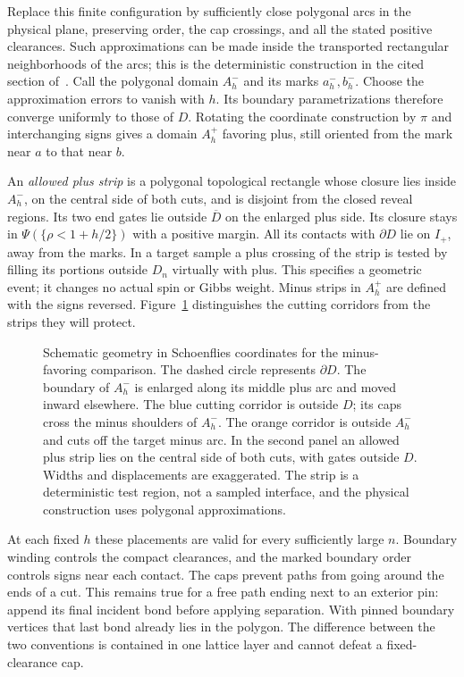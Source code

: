 Replace this finite configuration by sufficiently close polygonal
arcs in the physical plane, preserving order, the cap crossings, and
all the stated positive clearances.  Such approximations can be made
inside the transported rectangular neighborhoods of the arcs; this is
the deterministic construction in the cited section of~\cite{S}.
Call the polygonal domain $A_h^-$ and its marks $a_h^-,b_h^-$.
Choose the approximation errors to vanish with $h$.  Its boundary
parametrizations therefore converge uniformly to those of $D$.
Rotating the coordinate construction by $\pi$ and interchanging signs
gives a domain $A_h^+$ favoring plus, still oriented from the mark
near $a$ to that near $b$.

An \emph{allowed plus strip} is a polygonal topological rectangle
whose closure lies inside $A_h^-$, on the central side of both cuts,
and is disjoint from the closed reveal regions.  Its two end gates lie outside $\overline D$
on the enlarged plus side.  Its closure stays in
$\Psi(\{\rho<1+h/2\})$ with a positive margin.  All its contacts
with $\partial D$ lie on $I_+$, away from the marks.  In a target
sample a plus crossing of the strip is tested by filling its portions
outside $D_n$ virtually with plus.  This specifies a geometric event;
it changes no actual spin or Gibbs weight.  Minus strips in $A_h^+$
are defined with the signs reversed.  Figure~\ref{fig:strip-squeeze}
distinguishes the cutting corridors from the strips they will protect.

\begin{figure}[tbp]
 \centering
 
 \caption{Schematic geometry in Schoenflies coordinates for the
 minus-favoring comparison.  The dashed circle represents
 $\partial D$.  The boundary of $A_h^-$ is enlarged along its middle
 plus arc and moved inward elsewhere.  The blue cutting corridor is
 outside $D$; its caps cross the minus shoulders of $A_h^-$.  The
 orange corridor is outside $A_h^-$ and cuts off the target minus
 arc.  In the second panel an allowed plus strip lies on the central
 side of both cuts, with gates outside $D$.  Widths and displacements
 are exaggerated.  The strip is a deterministic test region, not a
 sampled interface, and the physical construction uses polygonal
 approximations.}
 \label{fig:strip-squeeze}
\end{figure}

At each fixed $h$ these placements are valid for every sufficiently
large $n$.  Boundary winding controls the compact clearances, and the
marked boundary order controls signs near each contact.  The caps
prevent paths from going around the ends of a cut.  This remains true
for a free path ending next to an exterior pin: append its final
incident bond before applying separation.  With pinned boundary
vertices that last bond already lies in the polygon.  The difference
between the two conventions is contained in one lattice layer and
cannot defeat a fixed-clearance cap.

